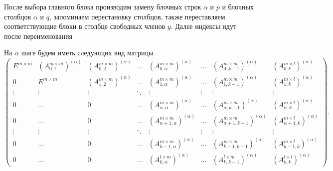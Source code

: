 \documentclass[a4paper,12pt]{article}
\newcommand{\br}[1]{\left(#1\right)}
\begin{document}
После выбора главного блока производим замену блочных строк $\alpha$ и $p$ и блочных столбцов $\alpha$ и $q$, запоминаем перестановку столбцов, также переставляем соответствующие блоки в столбце свободных членов $y$. Далее индексы идут после переименования

На $\alpha$ шаге будем иметь следующих вид матрицы
\[
    \begin{pmatrix}
        E^{m \times m} & \br{A_{0, 1}^{m \times m}}^{(\alpha)} & \br{A_{0, 2}^{m \times m}}^{(\alpha)} & \dots  & \br{A_{0, \alpha}^{m \times m}}^{(\alpha)}          & \dots  & \br{A_{0, k - 1}^{m \times m}}^{(\alpha)}          & \br{A_{0, k}^{m \times l}}^{(\alpha)}          \\
        0              & E^{m \times m}                        & \br{A_{1, 2}^{m \times m}}^{(\alpha)} & \dots  & \br{A_{1, \alpha}^{m \times m}}^{(\alpha)}          & \dots  & \br{A_{1, k - 1}^{m \times m}}^{(\alpha)}          & \br{A_{1, k}^{m \times l}}^{(\alpha)}          \\
        \vdots         & \vdots                                & \vdots                                & \ddots & \vdots                                              & \vdots & \vdots                                             & \vdots                                         \\
        0              & \dots                                 & 0                                     & \dots  & \br{A_{\alpha, \alpha}^{m \times m}}^{(\alpha)}     & \dots  & \br{A_{\alpha, k - 1}^{m \times m}}^{(\alpha)}     & \br{A_{\alpha, k}^{m \times l}}^{(\alpha)}     \\
        0              & \dots                                 & 0                                     & \dots  & \br{A_{\alpha + 1, \alpha}^{m \times m}}^{(\alpha)} & \dots  & \br{A_{\alpha + 1, k - 1}^{m \times m}}^{(\alpha)} & \br{A_{\alpha + 1, k}^{m \times l}}^{(\alpha)} \\
        \vdots         & \vdots                                & \vdots                                & \ddots & \vdots                                              & \vdots & \vdots                                             & \vdots                                         \\
        0              & \dots                                 & 0                                     & \dots  & \br{A_{k - 1, \alpha}^{m \times m}}^{(\alpha)}      & \dots  & \br{A_{k - 1, k - 1}^{m \times m}}^{(\alpha)}      & \br{A_{k - 1, k}^{m \times l}}^{(\alpha)}      \\
        0              & \dots                                 & 0                                     & \dots  & \br{A_{k, \alpha}^{l \times m}}^{(\alpha)}          & \dots  & \br{A_{k, k - 1}^{l \times m}}^{(\alpha)}          & \br{A_{k, k}^{l \times l}}^{(\alpha)}
    \end{pmatrix}.
\]
\end{document}
